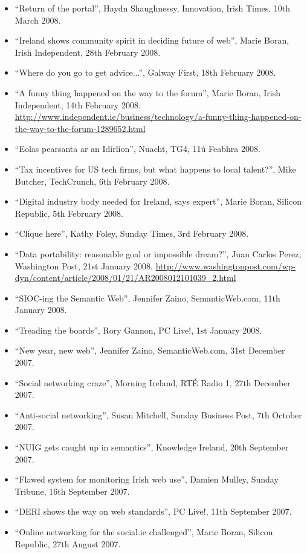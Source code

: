 \documentclass[10pt,a4paper]{res} %
\begin{document}
\begin{resume}
{\begin{itemize}
\item ``Return of the portal'', Haydn Shaughnessy, Innovation, Irish Times, 10th March 2008.
\item ``Ireland shows community spirit in deciding future of web'', Marie Boran, Irish Independent, 28th February 2008.
\item ``Where do you go to get advice...'', Galway First, 18th February 2008.
\item ``A funny thing happened on the way to the forum'', Marie Boran, Irish Independent, 14th February 2008. \url{http://www.independent.ie/business/technology/a-funny-thing-happened-on-the-way-to-the-forum-1289652.html}
\item ``Eolas pearsanta ar an Idirl\'{i}on'', Nuacht, TG4, 11\'{u} Feabhra 2008.
\item ``Tax incentives for US tech firms, but what happens to local talent?'', Mike Butcher, TechCrunch, 6th February 2008.
\item ``Digital industry body needed for Ireland, says expert'', Marie Boran, Silicon Republic, 5th February 2008.
\item ``Clique here'', Kathy Foley, Sunday Times, 3rd February 2008.
\item ``Data portability: reasonable goal or impossible dream?'', Juan Carlos Perez, Washington Post, 21st January 2008. \url{http://www.washingtonpost.com/wp-dyn/content/article/2008/01/21/AR2008012101039_2.html}
\item ``SIOC-ing the Semantic Web'', Jennifer Zaino, SemanticWeb.com, 11th January 2008.
\item ``Treading the boards'', Rory Gannon, PC Live!, 1st January 2008.
\item ``New year, new web'', Jennifer Zaino, SemanticWeb.com, 31st December 2007.
\item ``Social networking craze'', Morning Ireland, RT\'{E} Radio 1, 27th December 2007.
\item ``Anti-social networking'', Susan Mitchell, Sunday Business Post, 7th October 2007.
\item ``NUIG gets caught up in semantics'', Knowledge Ireland, 20th September 2007.
\item ``Flawed system for monitoring Irish web use'', Damien Mulley, Sunday Tribune, 16th September 2007.
\item ``DERI shows the way on web standards'', PC Live!, 11th September 2007.
\item ``Online networking for the social.ie challenged'', Marie Boran, Silicon Republic, 27th August 2007.

\end{itemize}}
\end{resume}
\end{document}
